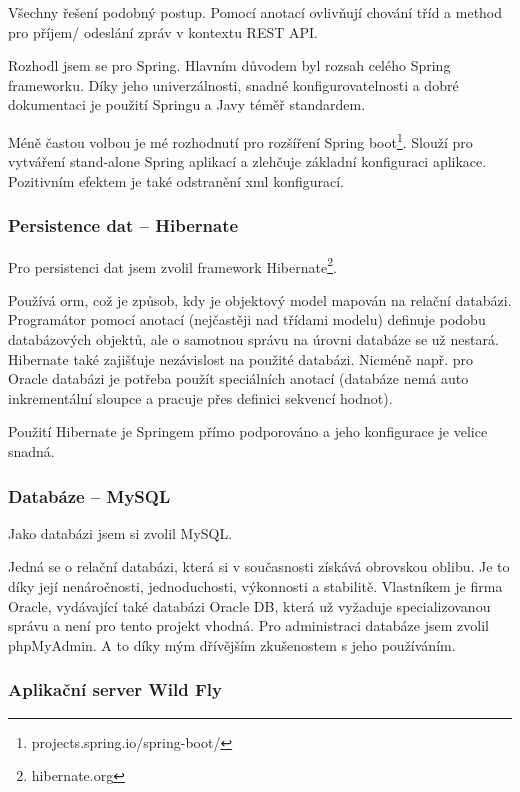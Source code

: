\documentclass[thesis=B,czech]{FITthesis}[2012/06/26]
\begin{document}
Všechny řešení podobný postup. Pomocí anotací ovlivňují chování tříd a method pro příjem/ odeslání zpráv v kontextu REST API. 

Rozhodl jsem se pro Spring. Hlavním důvodem byl rozsah celého Spring frameworku. Díky jeho univerzálnosti, snadné konfigurovatelnosti a dobré dokumentaci je použití Springu a Javy téměř standardem.    

Méně častou volbou je mé rozhodnutí pro rozšíření Spring boot\footnote{projects.spring.io/spring-boot/}. Slouží pro vytváření stand-alone Spring aplikací a zlehčuje základní konfiguraci aplikace. Pozitivním efektem je také odstranění \acrshort{xml} konfigurací.

\subsubsection{Persistence dat -- Hibernate}
\label{technology:hibernate}
Pro persistenci dat jsem zvolil framework Hibernate\footnote{hibernate.org}. 

Používá \acrshort{orm}, což je způsob, kdy je objektový model mapován na relační databázi. Programátor pomocí anotací (nejčastěji nad třídami modelu) definuje podobu databázových objektů, ale o samotnou správu na úrovni databáze se už nestará. Hibernate také zajišťuje nezávislost na použité databázi. Nicméně např. pro Oracle databázi je potřeba použít speciálních anotací (databáze nemá auto inkrementální sloupce a pracuje přes definici sekvencí hodnot).

Použití Hibernate je Springem přímo podporováno a jeho konfigurace je velice snadná.

\subsubsection {Databáze -- MySQL}

Jako databázi jsem si zvolil MySQL. 

Jedná se o relační databázi, která si v současnosti získává obrovskou oblibu. Je to díky její nenáročnosti, jednoduchosti, výkonnosti a stabilitě. Vlastníkem je firma Oracle, vydávající také databázi Oracle DB, která už vyžaduje specializovanou správu a není pro tento projekt vhodná. Pro administraci databáze jsem zvolil phpMyAdmin. A to díky mým dřívějším zkušenostem s jeho používáním.  

\subsubsection {Aplikační server Wild Fly}
\end{document}
